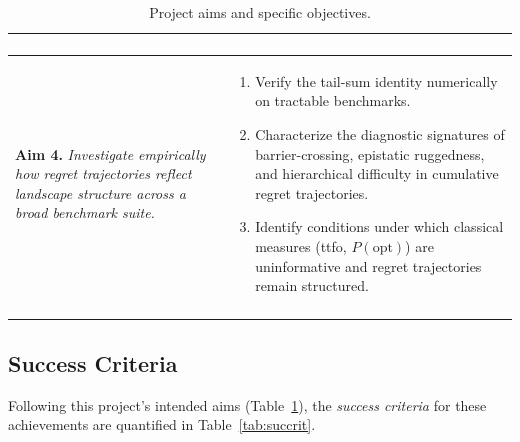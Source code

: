 \begin{longtable}{||p{}|p{}||}
\begin{enumerate}[topsep=0pt, partopsep=0pt, itemsep=0pt,
      parsep=0pt, leftmargin=*]
  \end{enumerate}
  \\
  \hline
  \textbf{Aim 4. } \emph{Investigate empirically how regret trajectories
  reflect landscape structure across a broad benchmark suite.}
  &
  \begin{enumerate}[topsep=0pt, partopsep=0pt, itemsep=0pt,
      parsep=0pt, leftmargin=*]
    \item Verify the tail-sum identity numerically on tractable benchmarks.
    \item Characterize the diagnostic signatures of barrier-crossing,
      epistatic ruggedness, and hierarchical difficulty in cumulative
      regret trajectories.
    \item Identify conditions under which classical measures (\acrshort{ttfo},
      $P(\text{opt})$) are uninformative and regret trajectories remain
      structured.
  \end{enumerate}
  \\
  \hline
  \caption{Project aims and specific objectives.}
  \label{tab:aims}
\end{longtable}

\subsection{Success Criteria}
\label{subsec:intro:success}
Following this project's intended aims (Table~\ref{tab:aims}), the
\emph{success criteria} for these achievements are quantified in
Table~\ref{tab:succrit}.

